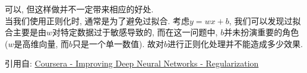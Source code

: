 \documentclass[]{subfiles}
\begin{document}
可以, 但这样做并不一定带来相应的好处.\\
当我们使用正则化时, 通常是为了避免过拟合.
考虑$y = wx + b$, 我们可以发现过拟合主要是由$w$对特定数据过于敏感导致的,
而在这一问题中, $b$并未扮演重要的角色
($w$是高维向量, 而$b$只是一个单一数值).
故对$b$进行正则化处理并不能造成多少效果.

引用自:
\href{https://www.coursera.org/learn/deep-neural-network/lecture/Srsrc/regularization}{Coursera - Improving Deep Neural Networks - Regularization}
\end{document}
